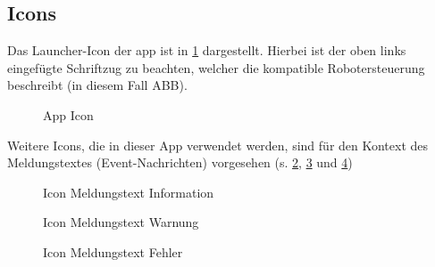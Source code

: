 \subsection{Icons}
Das Launcher-Icon der \gls{app} ist in \ref{fig:appIcon} dargestellt. Hierbei 
ist der oben links eingefügte Schriftzug zu beachten, welcher die kompatible 
Robotersteuerung beschreibt (in diesem Fall ABB).
\begin{figure}[H]
	\centering
	\caption[App Icon]{App Icon}
	\label{fig:appIcon}
\end{figure}

Weitere Icons, die in dieser App verwendet werden, sind für den Kontext des 
Meldungstextes (Event-Nachrichten) vorgesehen (s. \ref{fig:appInfo}, 
\ref{fig:appWarning} und \ref{fig:appError})

\begin{figure}[H]
	\centering
	\caption[Icon Meldungstext Information]{Icon Meldungstext Information}
	\label{fig:appInfo}
\end{figure}

\begin{figure}[H]
	\centering
	\caption[Icon Meldungstext Warnung]{Icon Meldungstext Warnung}
	\label{fig:appWarning}
\end{figure}

\begin{figure}[H]
	\centering
	\caption[Icon Meldungstext Fehler]{Icon Meldungstext Fehler}
	\label{fig:appError}
\end{figure}


